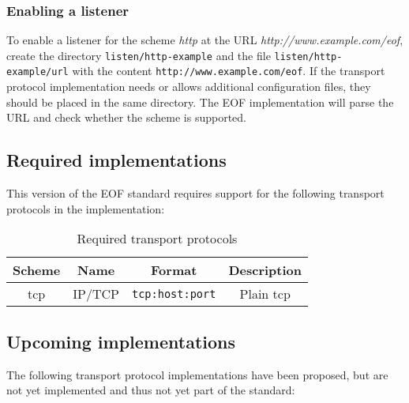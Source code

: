 \subsubsection{Enabling a listener}
\label{tplisten}
To enable a listener for the scheme \emph{http} at the URL
\emph{http://www.example.com/eof}, create
the directory \verb=listen/http-example= and the file
\verb=listen/http-example/url= with the content
\verb=http://www.example.com/eof=.
If the transport protocol implementation needs or allows additional
configuration files, they should be placed in the same directory.
The EOF implementation will parse the URL and check whether the
scheme is supported.
\subsection{Required implementations}
\label{tprequired}
This version of the EOF standard requires support for the following
transport protocols in the implementation:
\begin{longtable}{|c|c|c|c|}
\caption{Required transport protocols}\\
\hline
\textbf{Scheme} & \textbf{Name} & \textbf{Format} & \textbf{Description}\\
\hline
tcp & IP/TCP & \verb=tcp:host:port= & Plain tcp\\
\hline
\end{longtable}
\subsection{Upcoming implementations}
\label{tpupcoming}
The following transport protocol implementations have been proposed,
but are not yet implemented and thus not yet part of the standard:

